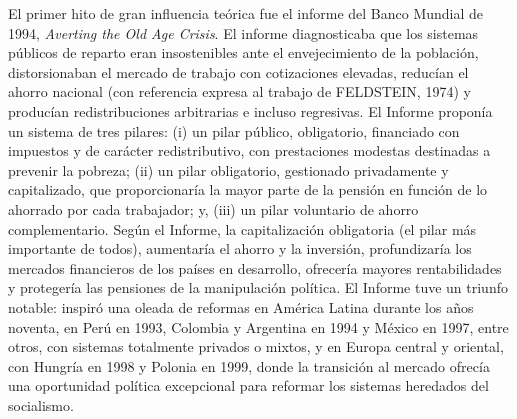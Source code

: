 \documentclass[10pt,a4paper]{article}
\begin{document}
El primer hito de gran influencia teórica fue el informe del Banco Mundial de 1994, \textit{Averting the Old Age Crisis}. El informe diagnosticaba que los sistemas públicos de reparto eran insostenibles ante el envejecimiento de la población, distorsionaban el mercado de trabajo con cotizaciones elevadas, reducían el ahorro nacional (con referencia expresa al trabajo de FELDSTEIN, 1974) y producían redistribuciones arbitrarias e incluso regresivas. El Informe proponía un sistema de tres pilares: (i) un pilar público, obligatorio, financiado con impuestos y de carácter redistributivo, con prestaciones modestas destinadas a prevenir la pobreza; (ii) un pilar obligatorio, gestionado privadamente y capitalizado, que proporcionaría la mayor parte de la pensión en función de lo ahorrado por cada trabajador; y, (iii) un pilar voluntario de ahorro complementario. Según el Informe, la capitalización obligatoria (el pilar más importante de todos), aumentaría el ahorro y la inversión, profundizaría los mercados financieros de los países en desarrollo, ofrecería mayores rentabilidades y protegería las pensiones de la manipulación política. El Informe tuve un triunfo notable: inspiró una oleada de reformas en América Latina durante los años noventa, en Perú en 1993, Colombia y Argentina en 1994 y México en 1997, entre otros, con sistemas totalmente privados o mixtos, y en Europa central y oriental, con Hungría en 1998 y Polonia en 1999, donde la transición al mercado ofrecía una oportunidad política excepcional para reformar los sistemas heredados del socialismo. 
\end{document}
